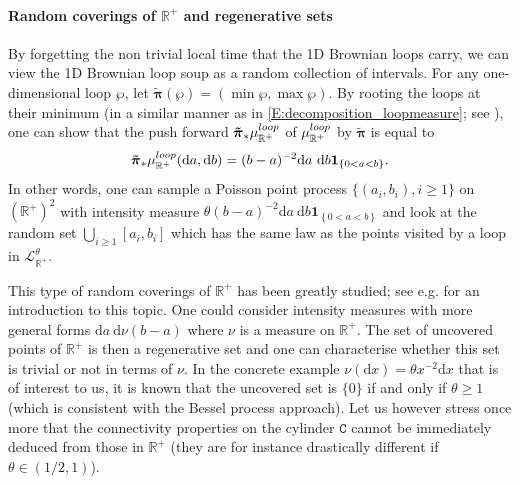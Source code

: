 \documentclass[11pt]{article}
\theoremstyle{remark}
\newcommand{\R}{\mathbb{R}}
\newcommand{\Lc}{\mathcal{L}}
\newcommand{\indic}[1]{ \mathbf{1}_{ \left\{ #1 \right\} } }
\renewcommand{\d}{\mathrm{d}}
\newcommand{\cyl}{\mathtt{C}}
\def \loopmeasure{\mu^{\rm loop}}
\numberwithin{equation}{section}
\begin{document}
\paragraph*{Random coverings of $\R^+$ and regenerative sets}

By forgetting the non trivial local time that the 1D Brownian loops carry, we can view the 1D Brownian loop soup as a random collection of intervals.
For any one-dimensional loop $\wp$, let $\boldsymbol{\tilde{\pi}}(\wp) = (\min \wp, \max \wp)$. By rooting the loops at their minimum (in a similar manner as in \eqref{E:decomposition_loopmeasure}; see \cite[Proposition 3.18]{Lupu18}), one can show that the push forward $\boldsymbol{\tilde{\pi}}_* \loopmeasure_{\R^+}$ of $\loopmeasure_{\R^+}$ by $\boldsymbol{\tilde{\pi}}$ is equal to
\[
\boldsymbol{\tilde{\pi}}_* \loopmeasure_{\R^+} (\d a, \d b) = (b-a)^{-2} \d a ~\d b \indic{0<a<b}.
\]
In other words, one can sample a Poisson point process $\{ (a_i,b_i), i \geq 1 \}$ on $(\R^+)^2$ with intensity measure $\theta (b-a)^{-2} \d a ~\d b \indic{0<a<b}$ and look at the random set $\bigcup_{i \geq 1} [a_i, b_i]$ which has the same law as the points visited by a loop in $\Lc_{\R^+}^\theta$.

This type of random coverings of $\R^+$ has been greatly studied; see e.g. \cite[Chapter 7]{Bertoin1999} for an introduction to this topic. One could consider intensity measures with more general forms $\d a ~ \d \nu(b-a)$ where $\nu$ is a measure on $\R^+$. The set of uncovered points of $\R^+$ is then a regenerative set and one can characterise whether this set is trivial or not in terms of $\nu$. In the concrete example $\nu(\d x) = \theta x^{-2} \d x$ that is of interest to us, it is known that the uncovered set is $\{0 \}$ if and only if $\theta \geq 1$ (which is consistent with the Bessel process approach). Let us however stress once more that the connectivity properties on the cylinder $\cyl$ cannot be immediately deduced from those in $\R^+$ (they are for instance drastically different if $\theta \in (1/2,1)$).

\end{document}
